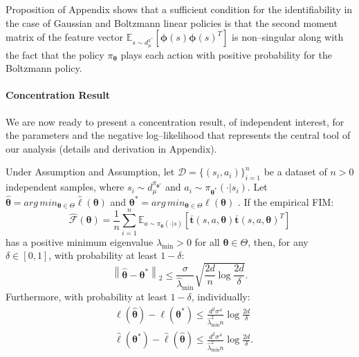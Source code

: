 \documentclass[letterpaper]{article} %
\begin{document}
Proposition of Appendix shows that a sufficient condition for the identifiability in the case of Gaussian and Boltzmann linear policies is that the second moment matrix of the feature vector $\mathbb{E}_{s \sim d_{\mu}^{\pi^*}} \left[ \mathbf{\phi}(s)\mathbf{\phi}(s)^T \right]$ is non--singular along with the fact that the policy $\pi_{\mathbf{\theta}}$ plays each action with positive probability for the Boltzmann policy.

\paragraph{Concentration Result} We are now ready to present a concentration result, of independent interest, for the parameters and the negative log--likelihood that represents the central tool of our analysis (details and derivation in Appendix).


Under Assumption and Assumption, let $\mathcal{D} = \{(s_i,a_i)\}_{i=1}^n$ be a dataset of $n>0$ independent samples, where $s_i \sim d_{\mu}^{\pi_{\mathbf{\theta}^*}}$ and $a_i \sim \pi_{\mathbf{\theta}^*}(\cdot|s_i)$. Let $\widehat{\mathbf{\theta}} = arg\,min_{\mathbf{\theta} \in \Theta} \widehat{\ell}(\mathbf{\theta})$ and $\mathbf{\theta}^* = arg\,min_{\mathbf{\theta} \in \Theta} {\ell}(\mathbf{\theta})$ . If the empirical FIM:
\begin{equation}
	\widehat{\mathcal{F}}(\mathbf{\theta}) = \frac{1}{n} \sum_{i=1}^n \mathbb{E}_{a \sim \pi_{\mathbf{\theta}}(\cdot|s)} \left[\mathbf{\overline{t}}(s,a,\mathbf{\theta})\mathbf{\overline{t}}(s,a,\mathbf{\theta})^T\right]
\end{equation}
has a positive minimum eigenvalue $\widehat{\lambda}_{\min} > 0$ for all $\mathbf{\theta} \in \Theta$, then, for any $\delta \in [0,1]$, with probability at least $1-\delta$:
	\begin{equation*}
		\left\| \widehat{ \mathbf{\theta}} - \mathbf{\theta}^* \right\|_2 \le \frac{\sigma}{\widehat{\lambda}_{\min}} \sqrt{\frac{2d}{n} \log \frac{2d}{\delta}}.
		\end{equation*}
Furthermore, with probability at least $1-\delta$, individually: 
	\begin{align*}
		&\ell(\widehat{\mathbf{\theta}}) - \ell({\mathbf{\theta}}^*) \le \frac{d^2\sigma^4}{\widehat{\lambda}_{\min}^2 n}  \log \frac{2d}{\delta}\\
		&\widehat{\ell}({\mathbf{\theta}}^*) - \widehat{\ell}(\widehat{\mathbf{\theta}})  \le \frac{ d^2\sigma^4}{\widehat{\lambda}_{\min}^2 n}  \log \frac{2d}{\delta}.
	\end{align*}
\end{document}
